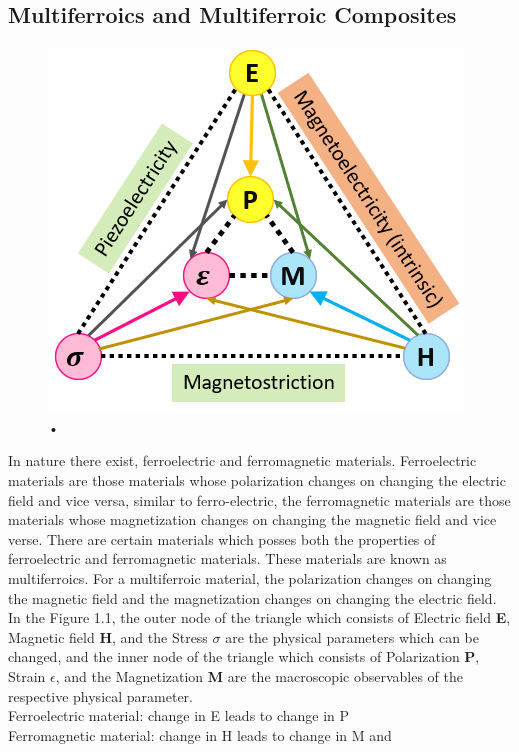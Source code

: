 \subsection{Multiferroics and Multiferroic Composites}
\begin{figure}[H]
	\centering
   \includegraphics[scale=0.56]{Images/18.png} 
   \caption{•}
\end{figure}
In nature there exist, ferroelectric and ferromagnetic materials. Ferroelectric materials are those materials whose polarization changes on changing the electric field and vice versa, similar to ferro-electric, the ferromagnetic materials are those materials whose magnetization changes on changing the magnetic field and vice verse. There are certain materials which posses both the properties of ferroelectric and ferromagnetic materials. These materials are known as multiferroics. For a multiferroic material, the polarization changes on changing the magnetic field and the magnetization changes on changing the electric field.\\   
In the Figure 1.1, the outer node of the triangle which consists of Electric field \textbf{E}, Magnetic field \textbf{H}, and the Stress \textbf{$\sigma$} are the physical parameters which can be changed, and the inner node of the triangle which consists of Polarization \textbf{P}, Strain \textbf{$\epsilon$}, and the Magnetization \textbf{M} are the  macroscopic observables of the respective physical parameter.\\
Ferroelectric material: change in E leads to change in P\\
Ferromagnetic material: change in H leads to change in M and\\
